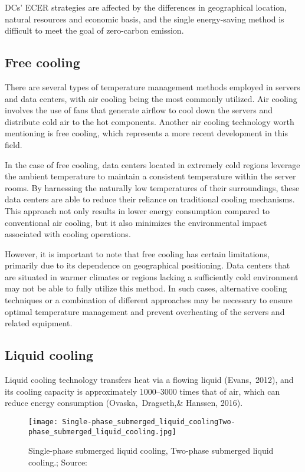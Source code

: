 \documentclass[
  a4paper,  %
  twoside,  %
  bibliography=totoc,
  headsepline,
  cleardoublepage=empty,
  parskip=half,
  draft=false
]{scrbook}
\begin{document}
DCs’ ECER strategies are affected by the differences in geographical location, natural resources and economic basis, and the single energy-saving method is difficult to meet the goal of zero-carbon emission.


\subsection{Free cooling}
There are several types of temperature management methods employed in servers and data centers, with air cooling being the most commonly utilized. Air cooling involves the use of fans that generate airflow to cool down the servers and distribute cold air to the hot components. Another air cooling technology worth mentioning is free cooling, which represents a more recent development in this field.

In the case of free cooling, data centers located in extremely cold regions leverage the ambient temperature to maintain a consistent temperature within the server rooms. By harnessing the naturally low temperatures of their surroundings, these data centers are able to reduce their reliance on traditional cooling mechanisms. This approach not only results in lower energy consumption compared to conventional air cooling, but it also minimizes the environmental impact associated with cooling operations.

However, it is important to note that free cooling has certain limitations, primarily due to its dependence on geographical positioning. Data centers that are situated in warmer climates or regions lacking a sufficiently cold environment may not be able to fully utilize this method. In such cases, alternative cooling techniques or a combination of different approaches may be necessary to ensure optimal temperature management and prevent overheating of the servers and related equipment.

\subsection{Liquid cooling}

Liquid cooling technology transfers heat via a flowing liquid (Evans, 2012), and its cooling capacity is approximately 1000–3000 times that of air, which can reduce energy consumption (Ovaska, Dragseth,\& Hanssen, 2016).


\begin{figure}
	\centering
	\texttt{[image: Single-phase\_submerged\_liquid\_coolingTwo-phase\_submerged\_liquid\_cooling.jpg]}
	\caption{Single-phase submerged liquid cooling, Two-phase submerged liquid cooling.; Source: \cite{li2023china}}
\end{figure}
\end{document}
